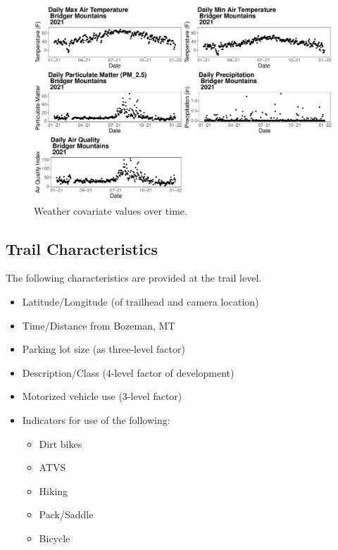 \documentclass[
]{book}
\providecommand{\tightlist}{%
  \setlength{\itemsep}{0pt}\setlength{\parskip}{0pt}}
\begin{document}
\begin{figure}

{\centering \includegraphics[width=1\linewidth]{../figures/weatherplots} 

}

\caption{Weather covariate values over time.}\label{fig:covariate-plots}
\end{figure}

\hypertarget{trail-characteristics}{%
\subsection{Trail Characteristics}\label{trail-characteristics}}

The following characteristics are provided at the trail level.

\begin{itemize}
\tightlist
\item
  Latitude/Longitude (of trailhead and camera location)
\item
  Time/Distance from Bozeman, MT
\item
  Parking lot size (as three-level factor)
\item
  Description/Class (4-level factor of development)
\item
  Motorized vehicle use (3-level factor)
\item
  Indicators for use of the following:

  \begin{itemize}
  \tightlist
  \item
    Dirt bikes
  \item
    ATVS
  \item
    Hiking
  \item
    Pack/Saddle
  \item
    Bicycle
  \end{itemize}
\end{itemize}
\end{document}
